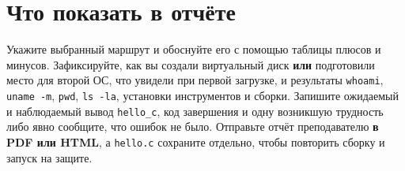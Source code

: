 \hypertarget{ux447ux442ux43e-ux43fux43eux43aux430ux437ux430ux442ux44c-ux432-ux43eux442ux447ux451ux442ux435}{%
\section{Что показать в
отчёте}\label{ux447ux442ux43e-ux43fux43eux43aux430ux437ux430ux442ux44c-ux432-ux43eux442ux447ux451ux442ux435}}

Укажите выбранный маршрут и обоснуйте его с помощью таблицы плюсов и
минусов. Зафиксируйте, как вы создали виртуальный диск \textbf{или}
подготовили место для второй ОС, что увидели при первой загрузке, и
результаты \texttt{whoami}, \texttt{uname\ -m}, \texttt{pwd},
\texttt{ls\ -la}, установки инструментов и сборки. Запишите ожидаемый и
наблюдаемый вывод \texttt{hello\_c}, код завершения и одну возникшую
трудность либо явно сообщите, что ошибок не было. Отправьте отчёт
преподавателю \textbf{в PDF или HTML}, а \texttt{hello.c} сохраните
отдельно, чтобы повторить сборку и запуск на защите.
